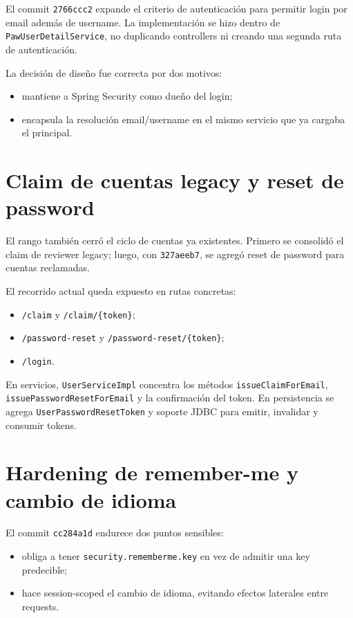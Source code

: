 \documentclass[11pt,a4paper]{report}
\newcommand{\commit}[1]{\texttt{#1}}
\newcommand{\code}[1]{\nolinkurl{#1}}
\begin{document}
El commit \commit{2766ccc2} expande el criterio de autenticaci\'on para permitir login por email adem\'as de username. La implementaci\'on se hizo dentro de \code{PawUserDetailService}, no duplicando controllers ni creando una segunda ruta de autenticaci\'on.

La decisi\'on de dise\~no fue correcta por dos motivos:

\begin{itemize}
  \item mantiene a Spring Security como due\~no del login;
  \item encapsula la resoluci\'on email/username en el mismo servicio que ya cargaba el principal.
\end{itemize}

\section{Claim de cuentas legacy y reset de password}

El rango tambi\'en cerr\'o el ciclo de cuentas ya existentes. Primero se consolid\'o el claim de reviewer legacy; luego, con \commit{327aeeb7}, se agreg\'o reset de password para cuentas reclamadas.

El recorrido actual queda expuesto en rutas concretas:

\begin{itemize}
  \item \code{/claim} y \code{/claim/\{token\}};
  \item \code{/password-reset} y \code{/password-reset/\{token\}};
  \item \code{/login}.
\end{itemize}

En servicios, \code{UserServiceImpl} concentra los m\'etodos \code{issueClaimForEmail}, \code{issuePasswordResetForEmail} y la confirmaci\'on del token. En persistencia se agrega \code{UserPasswordResetToken} y soporte JDBC para emitir, invalidar y consumir tokens.

\section{Hardening de remember-me y cambio de idioma}

El commit \commit{cc284a1d} endurece dos puntos sensibles:

\begin{itemize}
  \item obliga a tener \code{security.rememberme.key} en vez de admitir una key predecible;
  \item hace session-scoped el cambio de idioma, evitando efectos laterales entre requests.
\end{itemize}
\end{document}
